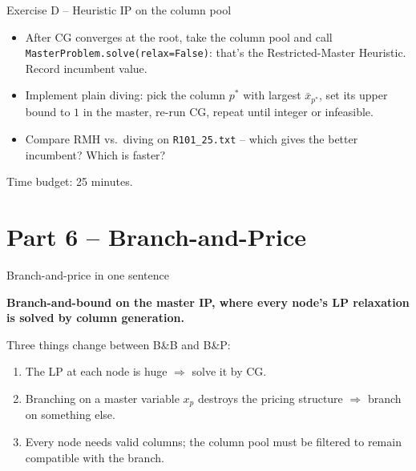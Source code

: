 \documentclass[10pt,aspectratio=169]{beamer}
\begin{document}
\begin{frame}{Exercise D -- Heuristic IP on the column pool}
  \begin{exbox}
    \begin{itemize}\small
      \item After CG converges at the root, take the column pool and call
            \texttt{MasterProblem.solve(relax=False)}: that's the
            Restricted-Master Heuristic. Record incumbent value.
      \item Implement plain diving: pick the column $p^*$ with largest
            $\bar x_{p^*}$, set its upper bound to $1$ in the master, re-run
            CG, repeat until integer or infeasible.
      \item Compare RMH vs.\ diving on \texttt{R101\_25.txt} -- which gives
            the better incumbent? Which is faster?
    \end{itemize}
    \alert{Time budget: 25 minutes.}
  \end{exbox}
\end{frame}

\section{Part 6 -- Branch-and-Price}

\begin{frame}{Branch-and-price in one sentence}
  \begin{tcolorbox}[colback=accent!8,colframe=accent,sharp corners,boxrule=0.6pt]
  \textbf{Branch-and-bound on the master IP, where every node's LP relaxation
  is solved by column generation.}
  \end{tcolorbox}

  \medskip
  Three things change between B\&B and B\&P:
  \begin{enumerate}\small
    \item The LP at each node is huge $\Rightarrow$ solve it by CG.
    \item Branching on a master variable $x_p$ destroys the pricing structure
          $\Rightarrow$ branch \alert{on something else}.
    \item Every node needs valid columns; the column pool must be filtered to
          remain compatible with the branch.
  \end{enumerate}
\end{frame}
\end{document}
